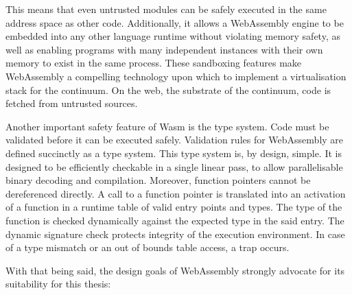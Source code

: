 \documentclass{ieeeaccess}
\begin{document}
This means that even untrusted modules can be safely executed in the same address space as other code. Additionally, it allows a WebAssembly engine to be embedded into any other language runtime without violating memory safety, as well as enabling programs with many independent instances with their own memory to exist in the same process. These sandboxing features make WebAssembly a compelling technology upon which to implement a virtualisation stack for the continuum. On the web, the substrate of the continuum, code is fetched from untrusted sources.

Another important safety feature of Wasm is the type system. Code must be validated before it can be executed safely. Validation rules for WebAssembly are defined succinctly as a type system. This type system is, by design, simple. It is designed to be efficiently checkable in a single linear pass, to allow parallelisable binary decoding and compilation. Moreover, function pointers cannot be dereferenced directly. A call to a function pointer is translated into an activation of a function in a runtime table of valid entry points and types. The type of the function is checked dynamically against the expected type in the said entry. The dynamic signature check protects integrity of the execution environment. In case of a type mismatch or an out of bounds table access, a trap occurs.

With that being said, the design goals of WebAssembly strongly advocate for its suitability for this thesis:
\end{document}
